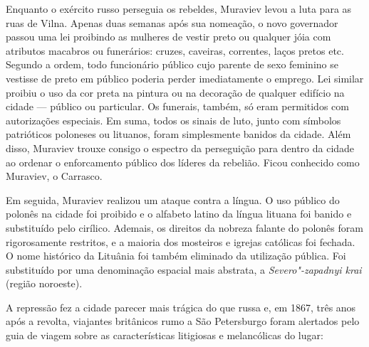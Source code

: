 Enquanto o exército russo perseguia os rebeldes, Muraviev levou a luta
para as ruas de Vilna. Apenas duas semanas após sua nomeação, o novo
governador passou uma lei proibindo as mulheres de vestir preto ou
qualquer jóia com atributos macabros ou funerários: cruzes, caveiras,
correntes, laços pretos etc. Segundo a ordem, todo funcionário público
cujo parente de sexo feminino se vestisse de preto em público poderia
perder imediatamente o emprego. Lei similar proibiu o uso da cor preta
na pintura ou na decoração de qualquer edifício na cidade --- público ou
particular. Os funerais, também, só eram permitidos com autorizações
especiais. Em suma, todos os sinais de luto, junto com símbolos
patrióticos poloneses ou lituanos, foram simplesmente banidos da cidade.
Além disso, Muraviev trouxe consigo o espectro da perseguição para
dentro da cidade ao ordenar o enforcamento público dos líderes da
rebelião. Ficou conhecido como Muraviev, o Carrasco.

Em seguida, Muraviev realizou um ataque contra a língua. O uso público
do polonês na cidade foi proibido e o alfabeto latino da língua lituana
foi banido e substituído pelo cirílico. Ademais, os direitos da nobreza
falante do polonês foram rigorosamente restritos, e a maioria dos
mosteiros e igrejas católicas foi fechada. O nome histórico da Lituânia
foi também eliminado da utilização pública. Foi substituído por uma
denominação espacial mais abstrata, a \emph{Severo"-zapadnyi krai}
(região noroeste).

A repressão fez a cidade parecer mais trágica do que russa e, em 1867,
três anos após a revolta, viajantes britânicos rumo a São Petersburgo
foram alertados pelo guia de viagem sobre as características litigiosas
e melancólicas do lugar:

